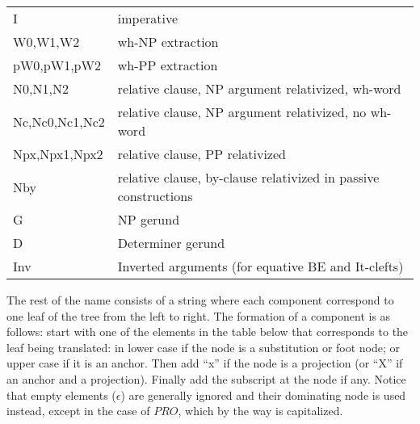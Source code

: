\begin{description}
\item\begin{tabular}{ll}
I&imperative\\
W0,W1,W2&wh-NP extraction\\
pW0,pW1,pW2&wh-PP extraction\\
N0,N1,N2&relative clause, NP argument relativized, wh-word \\
Nc,Nc0,Nc1,Nc2&relative clause, NP argument relativized, no wh-word \\
Npx,Npx1,Npx2&relative clause, PP relativized \\
Nby& relative clause, by-clause relativized in passive constructions\\
G&NP gerund\\
D&Determiner gerund\\
Inv&Inverted arguments (for equative BE and It-clefts)
\end{tabular}
\end{description}




\noindent The rest of the name consists of a string where each component
correspond to one leaf of the tree from the left to right. The formation
of a component is as follows: start with one of the elements in the table
below that corresponds to the leaf being translated: in lower case if the
node is a substitution or foot node;
 or upper case if it is an anchor. Then add 
``x'' if the node is a projection (or ``X'' if an anchor and a projection). 
Finally add the subscript at the node if any.
Notice that empty elements ($\epsilon$) are generally ignored and their
dominating node is used instead, except in the case of $PRO$, which by the
way is capitalized.

